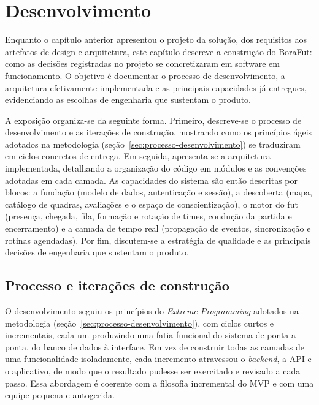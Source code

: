 \chapter{Desenvolvimento}
\label{sec:desenvolvimento}

  Enquanto o capítulo anterior apresentou o projeto da solução, dos requisitos aos artefatos de design e arquitetura, este capítulo descreve a construção do BoraFut: como as decisões registradas no projeto se concretizaram em software em funcionamento. O objetivo é documentar o processo de desenvolvimento, a arquitetura efetivamente implementada e as principais capacidades já entregues, evidenciando as escolhas de engenharia que sustentam o produto.

  A exposição organiza-se da seguinte forma. Primeiro, descreve-se o processo de desenvolvimento e as iterações de construção, mostrando como os princípios ágeis adotados na metodologia (seção~\ref{sec:processo-desenvolvimento}) se traduziram em ciclos concretos de entrega. Em seguida, apresenta-se a arquitetura implementada, detalhando a organização do código em módulos e as convenções adotadas em cada camada. As capacidades do sistema são então descritas por blocos: a fundação (modelo de dados, autenticação e sessão), a descoberta (mapa, catálogo de quadras, avaliações e o espaço de conscientização), o motor do fut (presença, chegada, fila, formação e rotação de times, condução da partida e encerramento) e a camada de tempo real (propagação de eventos, sincronização e rotinas agendadas). Por fim, discutem-se a estratégia de qualidade e as principais decisões de engenharia que sustentam o produto.

\section{Processo e iterações de construção}
  \label{sec:dev-processo}

    O desenvolvimento seguiu os princípios do \textit{Extreme Programming} adotados na metodologia (seção~\ref{sec:processo-desenvolvimento}), com ciclos curtos e incrementais, cada um produzindo uma fatia funcional do sistema de ponta a ponta, do banco de dados à interface. Em vez de construir todas as camadas de uma funcionalidade isoladamente, cada incremento atravessou o \textit{backend}, a API e o aplicativo, de modo que o resultado pudesse ser exercitado e revisado a cada passo. Essa abordagem é coerente com a filosofia incremental do MVP e com uma equipe pequena e autogerida.

